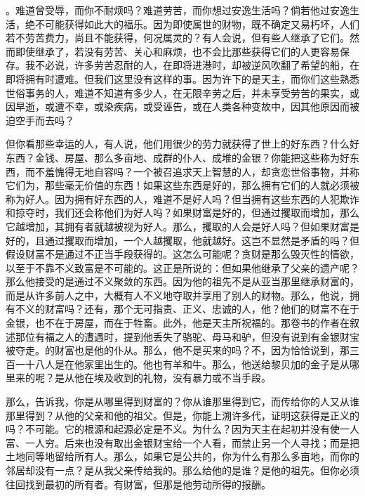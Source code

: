 。难道曾受辱，而你不耐烦吗？难道劳苦，而你想过安逸生活吗？倘若他过安逸生活，绝不可能获得如此大的福乐。因为即使属世的财物，既不确定又易朽坏，人们若不劳苦费力，尚且不能获得，何况属灵的？有人会说，但有些人继承了它们。然而即使继承了，若没有劳苦、关心和麻烦，也不会比那些获得它们的人更容易保存。我不必说，许多劳苦忍耐的人，在即将进港时，却被逆风吹翻了希望的船，在即将拥有时遭难。但我们这里没有这样的事。因为许下的是天主，而你们这些熟悉世俗事务的人，难道不知道有多少人，在无限辛劳之后，并未享受劳苦的果实，或因早逝，或遭不幸，或染疾病，或受诬告，或在人类各种变故中，因其他原因而被迫空手而去吗？\par

但你看那些幸运的人，有人说，他们用很少的劳力就获得了世上的好东西？什么好东西？金钱、房屋、那么多亩地、成群的仆人、成堆的金银？你能把这些称为好东西，而不羞愧得无地自容吗？一个被召追求天上智慧的人，却贪恋世俗事物，并称它们为，那些毫无价值的东西！如果这些东西是好的，那么拥有它们的人就必须被称为好人。因为拥有好东西的人，难道不是好人吗？但当拥有这些东西的人犯欺诈和掠夺时，我们还会称他们为好人吗？如果财富是好的，但通过攫取而增加，那么它越增加，其拥有者就越被视为好人。那么，攫取的人会是好人吗？但如果财富是好的，且通过攫取而增加，一个人越攫取，他就越好。这岂不显然是矛盾的吗？但假设财富不是通过不正当手段获得的。这怎么可能呢？贪财是那么毁灭性的情欲，以至于不靠不义致富是不可能的。这正是所说的：但如果他继承了父亲的遗产呢？那么他接受的是通过不义聚敛的东西。因为他的祖先不是从亚当那里继承财富的，而是从许多前人之中，大概有人不义地夺取并享用了别人的财物。那么，他说，拥有不义的财富吗？还有，那个无可指责、正义、忠诚的人，他？他们的财富不在于金银，也不在于房屋，而在于牲畜。此外，他是天主所祝福的。那卷书的作者在叙述那位有福之人的遭遇时，提到他丢失了骆驼、母马和驴，但没有说到有金银财宝被夺走。的财富也是他的仆从。那么，他不是买来的吗？不，因为恰恰说到，那三百一十八人是在他家里出生的。他也有羊和牛。那么，他送给黎贝加的金子是从哪里来的呢？是从他在埃及收到的礼物，没有暴力或不当手段。\par

那么，告诉我，你是从哪里得到财富的？你从谁那里得到它，而传给你的人又从谁那里得到？从他的父亲和他的祖父。但是，你能上溯许多代，证明这获得是正义的吗？不可能。它的根源和起源必定是不义。为什么？因为天主在起初并没有使一人富、一人穷。后来也没有取出金银财宝给一个人看，而禁止另一个人寻找；而是把土地同等地留给所有人。那么，如果它是公共的，你为什么有那么多亩地，而你的邻居却没有一点？是从我父亲传给我的。那么给他的是谁？是他的祖先。但你必须往回找到最初的所有者。有财富，但那是他劳动所得的报酬。\par


